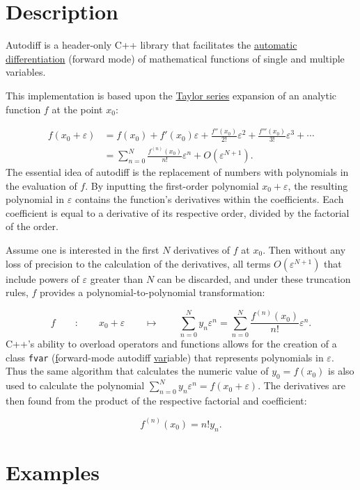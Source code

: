 \documentclass{article}
\begin{document}
\section{Description}

Autodiff is a header-only C++ library that facilitates the
\href{https://en.wikipedia.org/wiki/Automatic_differentiation}{automatic differentiation} (forward mode) of
mathematical functions of single and multiple variables.

This implementation is based upon the \href{https://en.wikipedia.org/wiki/Taylor_series}{Taylor series} expansion of
an analytic function $f$ at the point $x_0$:

\begin{align*}
f(x_0+\varepsilon) &= f(x_0) + f'(x_0)\varepsilon + \frac{f''(x_0)}{2!}\varepsilon^2 + \frac{f'''(x_0)}{3!}\varepsilon^3 + \cdots \\
  &= \sum_{n=0}^N\frac{f^{(n)}(x_0)}{n!}\varepsilon^n + O\left(\varepsilon^{N+1}\right).
\end{align*}
The essential idea of autodiff is the replacement of numbers with polynomials in the evaluation of $f$. By inputting
the first-order polynomial $x_0+\varepsilon$, the resulting polynomial in $\varepsilon$ contains the function's
derivatives within the coefficients. Each coefficient is equal to a derivative of its respective order, divided
by the factorial of the order.

Assume one is interested in the first $N$ derivatives of $f$ at $x_0$. Then without any loss of precision to the
calculation of the derivatives, all terms $O\left(\varepsilon^{N+1}\right)$ that include powers of $\varepsilon$
greater than $N$ can be discarded, and under these truncation rules, $f$ provides a polynomial-to-polynomial
transformation:

\[
f \qquad : \qquad x_0+\varepsilon \qquad \mapsto \qquad
    \sum_{n=0}^Ny_n\varepsilon^n=\sum_{n=0}^N\frac{f^{(n)}(x_0)}{n!}\varepsilon^n.
\]
C++'s ability to overload operators and functions allows for the creation of a class {\tt fvar}
(\underline{f}orward-mode autodiff \underline{var}iable) that represents polynomials in $\varepsilon$. Thus
the same algorithm that calculates the numeric value of $y_0=f(x_0)$ is also used to calculate the polynomial
$\sum_{n=0}^Ny_n\varepsilon^n=f(x_0+\varepsilon)$. The derivatives are then found from the product of the respective
factorial and coefficient:

\[ f^{(n)}(x_0)=n!y_n. \]

\section{Examples}
\end{document}
